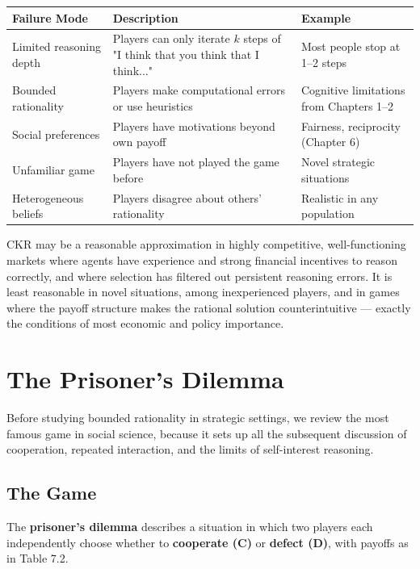 \documentclass[12pt, letterpaper]{article}
\begin{document}
\begin{table}[H]
\centering
\small
\begin{tabularx}{\linewidth}{lYY}
\toprule
Failure Mode & Description & Example \\
\midrule
Limited reasoning depth & Players can only iterate $k$ steps of "I think that you think that I think..." & Most people stop at 1--2 steps \\
Bounded rationality & Players make computational errors or use heuristics & Cognitive limitations from Chapters 1--2 \\
Social preferences & Players have motivations beyond own payoff & Fairness, reciprocity (Chapter 6) \\
Unfamiliar game & Players have not played the game before & Novel strategic situations \\
Heterogeneous beliefs & Players disagree about others' rationality & Realistic in any population \\
\bottomrule
\end{tabularx}
\end{table}


CKR may be a reasonable approximation in highly competitive, well-functioning markets where agents have experience and strong financial incentives to reason correctly, and where selection has filtered out persistent reasoning errors. It is least reasonable in novel situations, among inexperienced players, and in games where the payoff structure makes the rational solution counterintuitive --- exactly the conditions of most economic and policy importance.

\medskip


\section{The Prisoner's Dilemma}


Before studying bounded rationality in strategic settings, we review the most famous game in social science, because it sets up all the subsequent discussion of cooperation, repeated interaction, and the limits of self-interest reasoning.


\subsection{The Game}


The \textbf{prisoner's dilemma} describes a situation in which two players each independently choose whether to \textbf{cooperate (C)} or \textbf{defect (D)}, with payoffs as in Table 7.2.
\end{document}
